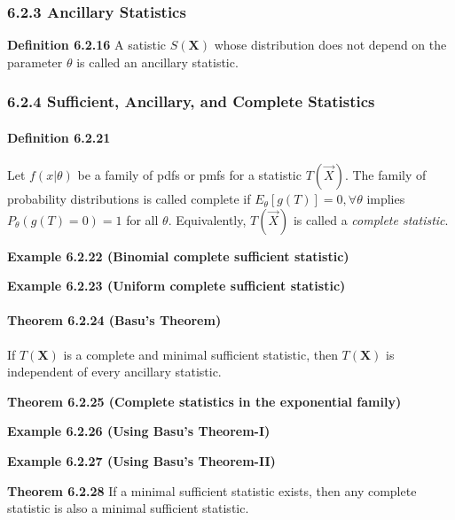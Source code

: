 \documentclass[6pt,Portrait]{article}
\let\oldparagraph\paragraph
\renewcommand{\paragraph}[1]{\oldparagraph{#1}\mbox{}}
\begin{document}
\hypertarget{ancillary}{%
\subsubsection{6.2.3 Ancillary Statistics}\label{ancillary}}

\textbf{Definition 6.2.16} A satistic \(S(\mathbf{X})\) whose
distribution does not depend on the parameter \(\theta\) is called an
ancillary statistic.

\hypertarget{sufficient-ancillary-and-complete-statistics}{%
\subsubsection{6.2.4 Sufficient, Ancillary, and Complete
Statistics}\label{sufficient-ancillary-and-complete-statistics}}

\hypertarget{comp}{%
\paragraph{\texorpdfstring{\textbf{Definition
6.2.21}}{Definition 6.2.21}}\label{comp}}

Let \(f(x|\theta)\) be a family of pdfs or pmfs for a statistic
\(T(\vec X)\). The family of probability distributions is called
complete if \(E_\theta[g(T)]=0, \forall\theta\) implies
\(P_\theta(g(T)=0)=1\) for all \(\theta\). Equivalently, \(T(\vec X)\)
is called a \emph{complete statistic}.

\textbf{Example 6.2.22 (Binomial complete sufficient statistic)}

\textbf{Example 6.2.23 (Uniform complete sufficient statistic)}

\hypertarget{Basu}{%
\paragraph{\texorpdfstring{\textbf{Theorem 6.2.24 (Basu's
Theorem)}}{Theorem 6.2.24 (Basu's Theorem)}}\label{Basu}}

If \(T(\mathbf{X})\) is a complete and minimal sufficient statistic,
then \(T(\mathbf{X})\) is independent of every ancillary statistic.

\textbf{Theorem 6.2.25 (Complete statistics in the exponential family)}

\textbf{Example 6.2.26 (Using Basu's Theorem-I)}

\textbf{Example 6.2.27 (Using Basu's Theorem-II)}

\textbf{Theorem 6.2.28} If a minimal sufficient statistic exists, then
any complete statistic is also a minimal sufficient statistic.
\end{document}
